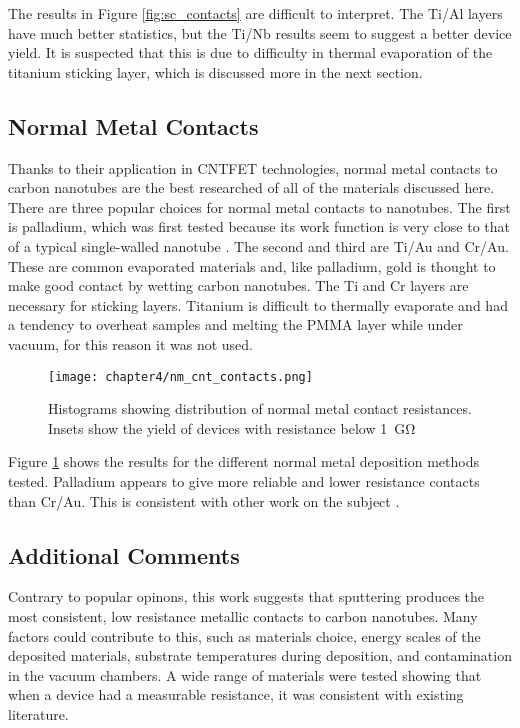 The results in Figure \ref{fig:sc_contacts} are difficult to interpret. The Ti/Al layers have much better statistics, but the Ti/Nb results seem to suggest a better device yield. It is suspected that this is due to difficulty in thermal evaporation of the titanium sticking layer, which is discussed more in the next section.

\subsection{Normal Metal Contacts}

Thanks to their application in CNTFET technologies, normal metal contacts to carbon nanotubes are the best researched of all of the materials discussed here. There are three popular choices for normal metal contacts to nanotubes. The first is palladium, which was first tested because its work function is very close to that of a typical single-walled  nanotube \cite{Javey2003, Jejurikar2010}. The second and third are Ti/Au and Cr/Au. These are common evaporated materials and, like palladium, gold is thought to make good contact by wetting carbon nanotubes. The Ti and Cr layers are necessary for sticking layers. Titanium is difficult to thermally evaporate and had a tendency to overheat samples and melting the PMMA layer while under vacuum, for this reason it was not used. 

\begin{figure}
    \centering
    \texttt{[image: chapter4/nm\_cnt\_contacts.png]}
    \caption{Histograms showing distribution of normal metal contact resistances. Insets show the yield of devices with resistance below \SI{1}{\giga\ohm}}
    \label{fig:nm_contacts}
\end{figure}

Figure \ref{fig:nm_contacts} shows the results for the different normal metal deposition methods tested. Palladium appears to give more reliable and lower resistance contacts than Cr/Au. This is consistent with other work on the subject \cite{Javey2003}.

\subsection{Additional Comments}

Contrary to popular opinons, this work suggests that sputtering produces the most consistent, low resistance metallic contacts to carbon nanotubes. Many factors could contribute to this, such as materials choice, energy scales of the deposited materials, substrate temperatures during deposition, and contamination in the vacuum chambers. A wide range of materials were tested showing that when a device had a measurable resistance, it was consistent with existing literature. 

